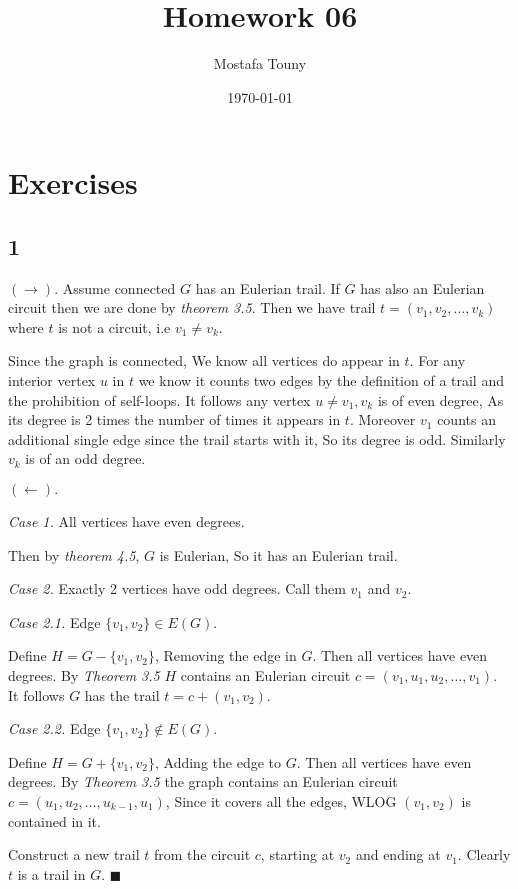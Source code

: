 \documentclass[12pt]{extarticle}
\title{Homework 06}
\author{Mostafa Touny}
\date{\today}
\begin{document}
\maketitle
\tableofcontents

\newpage


\section*{Exercises}



\subsection*{1}

$(\rightarrow).$ Assume connected $G$ has an Eulerian trail. If $G$ has also an Eulerian circuit then we are done by \textit{theorem 3.5}. Then we have trail $t = (v_1, v_2, \dots, v_k)$ where $t$ is not a circuit, i.e $v_1 \neq v_k$.

Since the graph is connected, We know all vertices do appear in $t$. For any interior vertex $u$ in $t$ we know it counts two edges by the definition of a trail and the prohibition of self-loops. It follows any vertex $u \neq v_1, v_k$ is of even degree, As its degree is 2 times the number of times it appears in $t$. Moreover $v_1$ counts an additional single edge since the trail starts with it, So its degree is odd. Similarly $v_k$ is of an odd degree.

$(\leftarrow).$ 

\textit{Case 1.} All vertices have even degrees.

Then by \textit{theorem 4.5}, $G$ is Eulerian, So it has an Eulerian trail.

\textit{Case 2.} Exactly 2 vertices have odd degrees. Call them $v_1$ and $v_2$.

\textit{Case 2.1.} Edge $\{ v_1, v_2 \} \in E(G)$.

Define $H = G - \{v_1,v_2\}$, Removing the edge in $G$. Then all vertices have even degrees. By \textit{Theorem 3.5} $H$ contains an Eulerian circuit $c = (v_1, u_1, u_2, \dots, v_1)$. It follows $G$ has the trail $t = c + (v_1, v_2)$.

\textit{Case 2.2.} Edge $\{ v_1, v_2 \} \notin E(G)$.

Define $H = G + \{v_1,v_2\}$, Adding the edge to $G$. Then all vertices have even degrees. By \textit{Theorem 3.5} the graph contains an Eulerian circuit $c = (u_1, u_2, \dots, u_{k-1}, u_1)$, Since it covers all the edges, WLOG $(v_1, v_2)$ is contained in it.

Construct a new trail $t$ from the circuit $c$, starting at $v_2$ and ending at $v_1$. Clearly $t$ is a trail in $G$. $\blacksquare$

\end{document}
